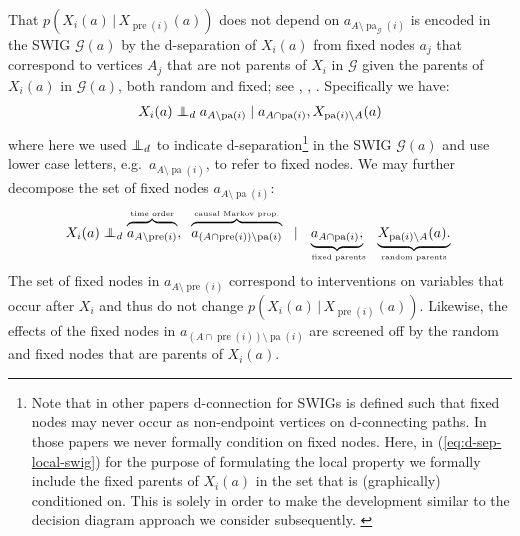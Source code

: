 \documentclass[11pt]{article}
\DeclareMathOperator{\pa}{pa}
\DeclareMathOperator{\pre}{pre}
\newcommand{\G}{{\mathscr G}}
\newcommand\indepd{\protect\mathpalette{\protect\independenTd}{\perp}}
\def\independenTd#1#2{\mathrel{\rlap{$#1#2$}\mkern2.5mu{#1#2}_d}}
\begin{document}
  That $p(X_i({a}) \,|\, X_{\pre(i)}({a}))$ does not depend on $a_{A \setminus \pa_{\G}(i)}$
is encoded in the SWIG $\G({ a})$ by the d-separation of  $X_i(a)$ from fixed nodes $a_j$ that correspond to vertices $A_j$ that are not parents of $X_i$ in $\G$ given the parents of $X_i(a)$ in $\G(a)$, both random and fixed; see  \citet{shpitser2021multivariate}, \citet{malinsky19po}, \citet{robins2018dseparation}.
  Specifically we have:
 \begin{align}\label{eq:d-sep-local-swig}
 X_i({a}) \indepd a_{A\setminus \pa(i)} \mid a_{A\cap \pa(i)}, X_{\pa(i)\setminus A}(a)
 \end{align}
 where here we used $\indepd$ to indicate d-separation\footnote{Note that in other papers \citep{shpitser2021multivariate,malinsky19po,thomas13swig} d-connection for SWIGs is defined such that fixed nodes may never occur as non-endpoint vertices on d-connecting paths. In those papers we never formally condition on fixed nodes.  Here, in (\ref{eq:d-sep-local-swig}) for the purpose of formulating the local property we formally include the fixed parents of $X_i(a)$ in the set that is (graphically) conditioned on. This is solely in order to make the development similar to the decision diagram approach we consider subsequently.%
 \label{foot:condition-on-fixed}}
 in the SWIG $\G(a)$ and use lower case letters, e.g.~$a_{A\setminus \pa(i)}$, to refer to fixed nodes.
  We may further decompose the set of fixed nodes $a_{A\setminus \pa(i)}$:
 \begin{align}\label{eq:d-sep-local-swig2}
 X_i({a}) \indepd \overbrace{\vphantom{X}a_{A\setminus \pre(i)}}^{\hbox{\tiny time order}},\;\;   
\overbrace{\vphantom{X}a_{(A\cap \pre(i))\setminus \pa(i)}}^{\hbox{\tiny causal Markov prop.}}\;\; \mid 
\underbrace{a_{A \cap \pa(i)},}_{\hbox{\tiny~~ fixed parents~~}}
\underbrace{X_{\pa(i) \setminus A}(a).}_{\hbox{\tiny ~~random parents~~}}
 \end{align}
The set of fixed nodes in $a_{A\setminus \pre(i)}$ correspond to interventions on variables that occur after $X_i$ and thus do not change 
$p(X_i({a}) \,|\, X_{\pre(i)}({a}))$. Likewise, the effects of the fixed nodes in $a_{(A\cap \pre(i))\setminus \pa(i)}$ are screened off by the random and fixed nodes that are parents of $X_i(a)$.
\medskip
\end{document}
